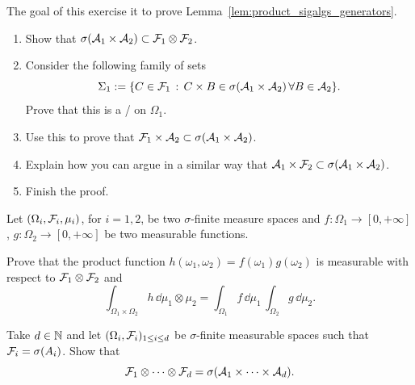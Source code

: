 \begin{problem}\label{prb:product_sigalgs_generators}
The goal of this exercise it to prove Lemma~\ref{lem:product_sigalgs_generators}.
\begin{enumerate}[label={(\alph*)}]
\item Show that $\sigma(\mathcal A_1 \times \mathcal A_2) \subset \mathcal F_1 \otimes \mathcal F_2$.
\item Consider the following family of sets
\[
	\Sigma_1 := \{C \in \mathcal F_1 \, : \, C \times B \in \sigma(\mathcal A_1 \times \mathcal A_2) \, \forall B \in \mathcal A_2\}.
\]
Prove that this is a \sigalg/ on $\Omega_1$.
\item Use this to prove that $\mathcal F_1 \times \mathcal A_2 \subset \sigma(\mathcal A_1 \times \mathcal A_2)$.
\item Explain how you can argue in a similar way that $\mathcal A_1 \times \mathcal F_2 \subset \sigma(\mathcal A_1 \times \mathcal A_2)$.
\item Finish the proof.
\end{enumerate}
\end{problem}

\begin{problem}
Let $(\Omega_i, \mathcal F_i, \mu_i)$, for $i = 1,2$, be two $\sigma$-finite measure spaces and $f : \Omega_1 \to [0,+\infty]$, $g : \Omega_2 \to [0,+\infty]$ be two measurable functions. 

Prove that the product function $h(\omega_1,\omega_2) = f(\omega_1) g(\omega_2)$ is measurable with respect to $\mathcal F_1 \otimes \mathcal F_2$ and
\[
	\int_{\Omega_1 \times \Omega_2} h \, \dd \mu_1 \otimes \mu_2 
	= \int_{\Omega_1} f \, \dd \mu_1 \, \int_{\Omega_2} g \, \dd \mu_2.
\]
\end{problem}

\begin{problem}
Take $d \in \mathbb N$ and let $(\Omega_i, \mathcal F_i)_{1 \le i \le d}$ be $\sigma$-finite measurable spaces such that $\mathcal F_i = \sigma(A_i)$. Show that
\[
	\mathcal F_1 \otimes \dots \otimes \mathcal F_d = \sigma(\mathcal A_1 \times \dots \times \mathcal A_d).
\]
\end{problem}




